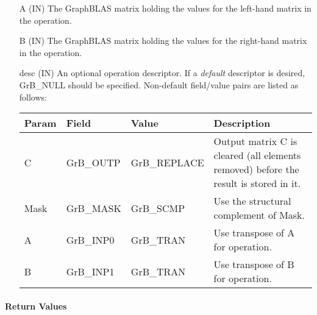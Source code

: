 \begin{itemize}[leftmargin=1.1in]
    \item[{\sf A}]     ({\sf IN}) The GraphBLAS matrix holding the values for
    the left-hand matrix in the operation.
    
    \item[{\sf B}]     ({\sf IN}) The GraphBLAS matrix holding the values for
    the right-hand matrix in the operation.
 
    \item[{\sf desc}] ({\sf IN}) An optional operation descriptor. If
    a \emph{default} descriptor is desired, {\sf GrB\_NULL} should be
    specified. Non-default field/value pairs are listed as follows:  \\

    \begin{tabular}{lllp{2.5in}}
        Param & Field  & Value & Description \\
        \hline
        {\sf C}    & {\sf GrB\_OUTP} & {\sf GrB\_REPLACE} & Output matrix {\sf C} is cleared (all elements removed) before the result is stored in it.  \\
        {\sf Mask} & {\sf GrB\_MASK} & {\sf GrB\_SCMP}   & Use the structural complement of {\sf Mask}. \\
        {\sf A}    & {\sf GrB\_INP0} & {\sf GrB\_TRAN}   & Use transpose of {\sf A} for operation. \\
        {\sf B}    & {\sf GrB\_INP1} & {\sf GrB\_TRAN}   & Use transpose of {\sf B} for operation. \\
    \end{tabular}
\end{itemize}

\paragraph{Return Values}

